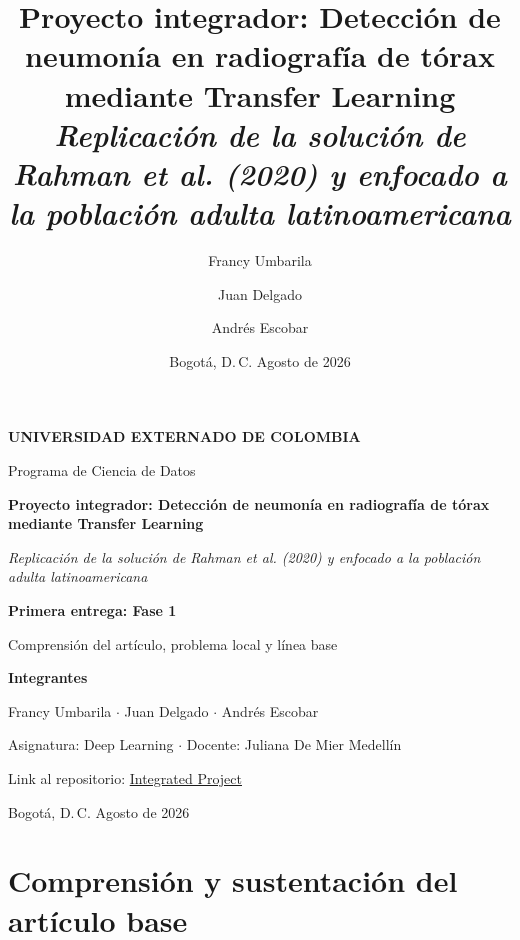 \documentclass[11pt]{article}
\title{%
  \textbf{Proyecto integrador: Detección de neumonía en radiografía de tórax mediante Transfer Learning}\\[0.3em]
  \large\textit{Replicación de la solución de Rahman et al. (2020) y enfocado a la población adulta latinoamericana}
}
\author{%
  Francy Umbarila \and Juan Delgado \and Andrés Escobar
}
\date{Bogotá, D.\,C. Agosto de 2026}
\begin{document}
\begin{titlepage}
\centering
\vspace{1cm}

{\large \textbf{UNIVERSIDAD EXTERNADO DE COLOMBIA}\par}
\vspace{0.3cm}
{\large Programa de Ciencia de Datos\par}
\vspace{2cm}

{\LARGE \textbf{Proyecto integrador: Detección de neumonía en radiografía de tórax mediante Transfer Learning}\par}
\vspace{0.5cm}
{\large \textit{Replicación de la solución de Rahman et al. (2020) y enfocado a la población adulta latinoamericana}\par}
\vspace{1.5cm}

{\large \textbf{Primera entrega: Fase 1}\par}
\vspace{0.2cm}
{\large Comprensión del artículo, problema local y línea base\par}
\vspace{2cm}

{\large \textbf{Integrantes}\par}
\vspace{0.2cm}
{\large Francy Umbarila \(\cdot\) Juan Delgado \(\cdot\) Andrés Escobar\par}
\vspace{1cm}

{\large Asignatura: Deep Learning \(\cdot\) Docente: Juliana De Mier Medellín\par}
\vspace{0.3cm}
{\large Link al repositorio: \href{https://github.com/6odoy/integrated_project}{Integrated Project}\par}

\vfill

{\large Bogotá, D.\,C. Agosto de 2026\par}

\end{titlepage}

\clearpage
{}

\section{Comprensión y sustentación del artículo base}
\end{document}
